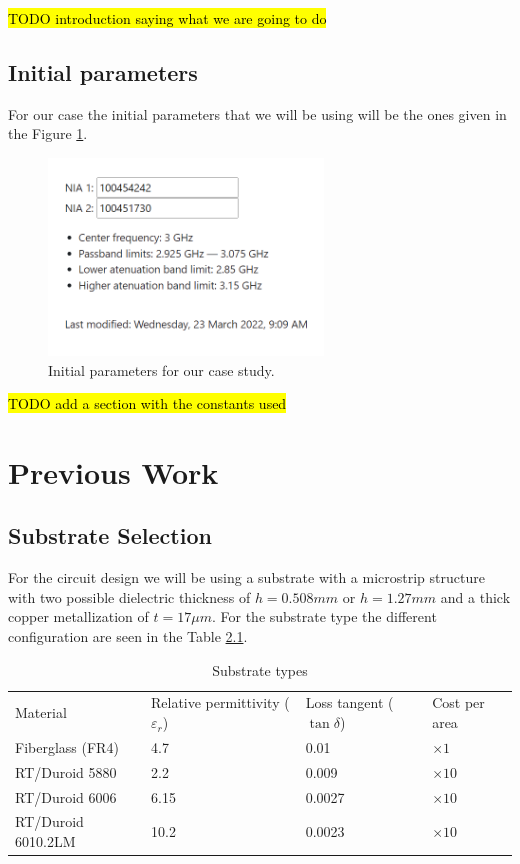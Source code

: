 \documentclass[12pt]{report} %
\newcommand{\todo}[1]{\sethlcolor{green}\hl{TODO #1}}
\begin{document}
\todo{introduction saying what we are going to do}

\section{Initial parameters}

For our case the initial parameters that we will be using will be the ones given in the Figure \ref{fig:introduction:initial_parameters}.

\begin{figure}[htbp]
    \centering
    \includegraphics[width=0.65\textwidth]{introduction/initial_parameters_calculator.png}
    \caption{Initial parameters for our case study.}
    \label{fig:introduction:initial_parameters}
\end{figure}

\todo{add a section with the constants used}


\chapter{Previous Work}
\section{Substrate Selection}

For the circuit design we will be using a substrate with a microstrip structure with two possible dielectric thickness of $h = 0.508 mm$ or $h = 1.27 mm$ and a thick copper metallization of $t = 17 \mu m$. For the substrate type the different configuration are seen in the Table \ref{tab:previous_work:substrate_types}.

\begin{table}[htbp]
    \centering
    \caption{Substrate types}
    \label{tab:previous_work:substrate_types}
    \begin{tabular}{@{}llll@{}}
    Material & Relative permittivity ($\varepsilon_r$) & Loss tangent ($\tan \delta$) & Cost per area \\
    Fiberglass (FR4) & 4.7 & 0.01 & $\times 1$ \\
    RT/Duroid 5880 & 2.2 & 0.009 & $\times 10$ \\
    RT/Duroid 6006 & 6.15 & 0.0027 & $\times 10$ \\
    RT/Duroid 6010.2LM & 10.2 & 0.0023 & $\times 10$ \\
    \end{tabular}
\end{table}
\end{document}

